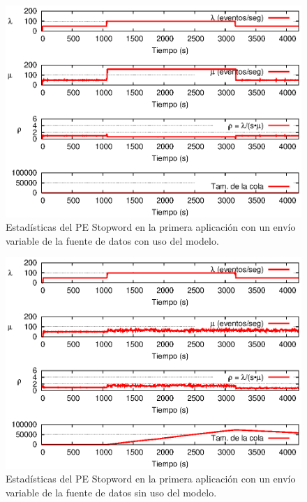 \begin{figure}[!ht]
\centering
    \includegraphics[scale=1.1]{images/exp/app1/normal/cm/statusStopwordPE.eps}
    \caption{Estad\'isticas del PE Stopword en la primera aplicaci\'on con un env\'io variable de la fuente de datos con uso del modelo.}
    \label{fig:app1-normal-statusStopwordPE-cm}
\end{figure}

\begin{figure}[!ht]
\centering
    \includegraphics[scale=1.1]{images/exp/app1/normal/sm/statusStopwordPE.eps}
    \caption{Estad\'isticas del PE Stopword en la primera aplicaci\'on con un env\'io variable de la fuente de datos sin uso del modelo.}
    \label{fig:app1-normal-statusStopwordPE-sm}
\end{figure}

